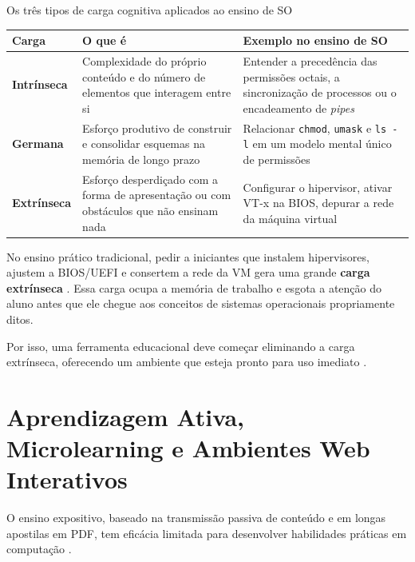 \begin{quadro}[htbp]
    \caption{Os três tipos de carga cognitiva aplicados ao ensino de SO}
    \label{qua:cargas-cognitivas}
    \footnotesize
    \begin{tabularx}{\textwidth}{|p{2.4cm}|L|L|}
        \hline
        \textbf{Carga} & \textbf{O que é} & \textbf{Exemplo no ensino de SO} \\
        \hline
        \textbf{Intrínseca} & Complexidade do próprio conteúdo e do número de elementos que interagem entre si & Entender a precedência das permissões octais, a sincronização de processos ou o encadeamento de \textit{pipes} \\
        \hline
        \textbf{Germana} & Esforço produtivo de construir e consolidar esquemas na memória de longo prazo & Relacionar \texttt{chmod}, \texttt{umask} e \texttt{ls -l} em um modelo mental único de permissões \\
        \hline
        \textbf{Extrínseca} & Esforço desperdiçado com a forma de apresentação ou com obstáculos que não ensinam nada & Configurar o hipervisor, ativar VT-x na BIOS, depurar a rede da máquina virtual \\
        \hline
    \end{tabularx}
\end{quadro}

No ensino prático tradicional, pedir a iniciantes que instalem hipervisores, ajustem a BIOS/UEFI e consertem a rede da VM gera uma grande \textbf{carga extrínseca} \cite{silva2021ensino}. Essa carga ocupa a memória de trabalho e esgota a atenção do aluno antes que ele chegue aos conceitos de sistemas operacionais propriamente ditos.

Por isso, uma ferramenta educacional deve começar eliminando a carga extrínseca, oferecendo um ambiente que esteja pronto para uso imediato \cite{guo2013online}.

\section{Aprendizagem Ativa, Microlearning e Ambientes Web Interativos}
\label{sec:aprendizagem-ativa}

O ensino expositivo, baseado na transmissão passiva de conteúdo e em longas apostilas em PDF, tem eficácia limitada para desenvolver habilidades práticas em computação \cite{benari2001constructivism, freeman2014active}.


